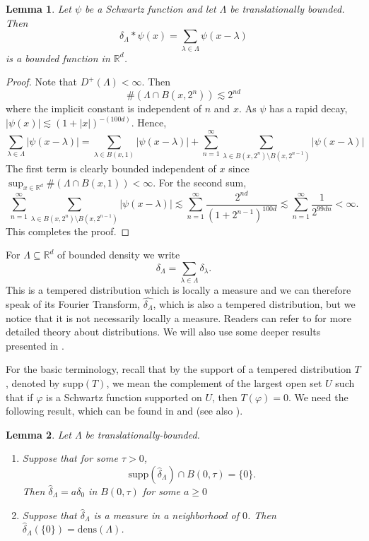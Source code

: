 \documentclass[12pt,a4paper,oneside]{amsart}
\newtheorem{lemma}{Lemma}
\theoremstyle{definition}
\newcommand{\RR}{{\mathbb R}}
\newcommand{\ft}[1]{\widehat{#1}}
\newcounter{rem}
\begin{document}
 \begin{lemma}\label{lemma-schwartz-bounded}
     Let $\psi$ be a Schwartz function and let $\Lambda$ be translationally bounded. Then 
     $$\delta_{\Lambda}\ast \psi (x) = \sum_{\lambda\in\Lambda}\psi (x-\lambda)
     $$
     is a bounded function in $\RR^d$. 
 \end{lemma}

 \begin{proof}Note that $D^{+}(\Lambda)<\infty$. {Then}
 $$
 \#(\Lambda\cap B(x,2^n)) \lesssim  2^{nd}
 $$
where the implicit constant is independent of $n$ {and $x$}.  As $\psi$ has a rapid decay, $|\psi(x)|\lesssim  (1+|x|)^{-(100d)}$.  Hence, 
$$    \sum_{\lambda\in\Lambda}|\psi (x-\lambda)| = \sum_{\lambda\in B(x,1)}|\psi(x-\lambda)|+\sum_{n=1}^{\infty}\sum_{\lambda\in B(x,2^n)\setminus B(x,2^{n-1})}|\psi(x-\lambda)|
$$
The first term is clearly bounded independent of $x$ since $\sup_{x\in\RR^d}\#(\Lambda\cap B(x,1))<\infty$. For the second sum, 
$$
\sum_{n=1}^{\infty}\sum_{\lambda\in B(x,2^n)\setminus B(x,2^{n-1})}|\psi(x-\lambda)|\lesssim  \sum_{n=1}^{\infty} \frac{2^{nd}}{(1+2^{n-1})^{100d}}\lesssim  \sum_{n=1}^{\infty} \frac{1}{2^{99dn}}<\infty.
$$
This completes the proof. 
\end{proof}


For $\Lambda \subseteq \RR^d$ of bounded density we write
$$
\delta_\Lambda = \sum_{\lambda\in\Lambda} \delta_\lambda.
$$
This is a tempered distribution which is locally a measure and we {can} therefore speak of its Fourier Transform, $\ft{\delta_\Lambda}$, which is also a tempered distribution, but we notice that it is not necessarily locally a measure. Readers can refer to \cite{rudin1973fa} for more detailed theory about distributions. We will also use some deeper {results} presented in \cite{knapp2017advanced}. 


For the basic terminology, recall that by the support of a tempered distribution $T$, denoted by supp$(T)$, we mean the complement of the largest open set $U$ such that if $\varphi$ is a Schwartz function supported on $U$, {then} $T(\varphi) = 0$. We need the following result, which can be found in \cite[Lemma 4.5]{gabardo2009weighted} and \cite[Theorem 5]{kolountzakis2000structure} (see also \cite[Theorem 7]{kolountzakis2000structure}). 

\begin{lemma}\label{lemma-trans-bdd}
Let $\Lambda$ be translationally-bounded. 
\begin{enumerate}  
\item Suppose that for some $\tau>0$, 
    $$
    \mbox{supp}(\ft\delta_{\Lambda}) \cap B(0,\tau) = \{0\}.
    $$
    Then $\ft\delta_{\Lambda} = a\delta_0$ in $B(0,\tau)$ for some {$a\ge0$}
    \item Suppose that $\ft\delta_{\Lambda}$ is a measure in a neighborhood of $0$. Then $ \ft\delta_{\Lambda}(\{0\}) =\mbox{dens}(\Lambda)$.
\end{enumerate}
\end{lemma}
\end{document}
